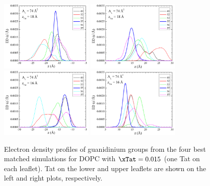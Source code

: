 \begin{figure}[htbp]
  \includegraphics[width=0.4\textwidth]{figures/Tat/MD_Results/guanidinium/dopc-tat2_guan_74-0_L}
  \includegraphics[width=0.4\textwidth]{figures/Tat/MD_Results/guanidinium/dopc-tat2_guan_74-0_R}
  \includegraphics[width=0.4\textwidth]{figures/Tat/MD_Results/guanidinium/dopc-tat2_guan_74-1_L}
  \includegraphics[width=0.4\textwidth]{figures/Tat/MD_Results/guanidinium/dopc-tat2_guan_74-1_R}
  \caption{Electron density profiles of guanidinium groups 
  from the four best matched simulations for DOPC with $\xTat = 0.015$ 
  (one Tat on each leaflet). Tat on the lower and upper leaflets
  are shown on the left and right plots, respectively.}
  \label{fig:MD_guanidinium}
\end{figure}

